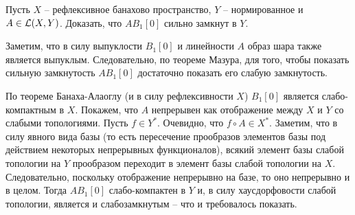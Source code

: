 \begin{task}[T14]
    Пусть $X$ -- рефлексивное банахово пространство, $Y$ -- нормированное и $A \in \mathcal{L}(X, Y)$.
    Доказать, что $AB_1[0]$ сильно замкнут в $Y$.
\end{task}
\begin{solution}
    Заметим, что в силу выпуклости $B_1[0]$ и линейности $A$ образ шара также является выпуклым.
    Следовательно, по теореме Мазура, для того, чтобы показать сильную замкнутость $AB_1[0]$ достаточно показать его слабую замкнутость.

    По теореме Банаха-Алаоглу (и в силу рефлексивности $X$) $B_1[0]$ является слабо-компактным в $X$.
    Покажем, что $A$ непрерывен как отображение между $X$ и $Y$ со слабыми топологиями.
    Пусть $f \in Y^*$.
    Очевидно, что $f \circ A \in X^*$.
    Заметим, что в силу явного вида базы (то есть пересечение прообразов элементов базы под действием некоторых непрерывных функционалов), всякий элемент базы слабой топологии на $Y$ прообразом переходит в элемент базы слабой топологии на $X$.
    Следовательно, поскольку отображение непрерывно на базе, то оно непрерывно и в целом.
    Тогда $AB_1[0]$ слабо-компактен в $Y$ и, в силу хаусдорфовости слабой топологии, является и слабозамкнутым -- что и требовалось показать.
\end{solution}
